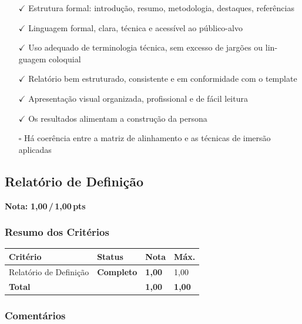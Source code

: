 \documentclass[
  sigconf,
  nonacm, %
  language=portuguese
]{acmart}
\newcommand{\notadestaque}[2]{%
  \noindent\textbf{Nota:}\enspace%
  {\large\bfseries\color{cred}#1\,/\,#2\,pts}%
}
\newcommand{\statusok}[1]{{\small\bfseries\color{cgood}#1}}
\begin{document}
\begin{itemize}[leftmargin=14pt,itemsep=1pt,topsep=3pt,parsep=0pt]
  \item[\textcolor{cgood}{$\checkmark$}] {\small\textcolor{cgood}{Estrutura formal: introdução, resumo, metodologia, destaques, referências}}
  \item[\textcolor{cgood}{$\checkmark$}] {\small\textcolor{cgood}{Linguagem formal, clara, técnica e acessível ao público-alvo}}
  \item[\textcolor{cgood}{$\checkmark$}] {\small\textcolor{cgood}{Uso adequado de terminologia técnica, sem excesso de jargões ou lin- guagem coloquial}}
  \item[\textcolor{cgood}{$\checkmark$}] {\small\textcolor{cgood}{Relatório bem estruturado, consistente e em conformidade com o template}}
  \item[\textcolor{cgood}{$\checkmark$}] {\small\textcolor{cgood}{Apresentação visual organizada, profissional e de fácil leitura}}
  \item[\textcolor{cgood}{$\checkmark$}] {\small\textcolor{cgood}{Os resultados alimentam a construção da persona}}
  \item[$\square$] {\small\textcolor{cmuted}{Há coerência entre a matriz de alinhamento e as técnicas de imersão aplicadas}}
\end{itemize}

\subsection{Relatório de Definição}

\notadestaque{1,00}{1,00}

\subsubsection*{Resumo dos Critérios}

\begin{tabular}{@{} L{2.6cm} C{2.5cm} C{1.1cm} C{1.1cm} @{}}
\toprule
\textbf{Critério} & \textbf{Status} & \textbf{Nota} & \textbf{Máx.} \\
\midrule
Relatório de Definição & \statusok{Completo} & \textbf{1,00} & 1,00 \\
\midrule
\textbf{Total} & & \textbf{\color{cred}1,00} & \textbf{1,00} \\
\bottomrule
\end{tabular}

\subsubsection*{Comentários}
\end{document}
